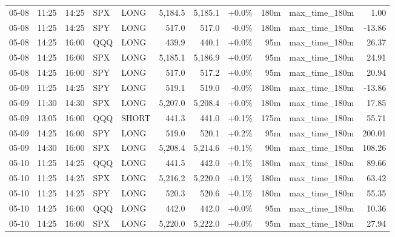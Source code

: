 \documentclass[11pt,a4paper,twoside]{article}
\begin{document}
\begin{center}
\begin{longtable}{>{\color{txtmain}}l l l l l r r r r >{\color{txtmain}}l r}
05-08 & 11:25 & 14:25 & SPX & LONG & 5,184.5 & 5,185.1 & \textcolor{wingreen}{+0.0\%} & 180m & max\_time\_180m & \textcolor{wingreen}{1.00} \\
05-08 & 11:25 & 14:25 & SPY & LONG & 517.0 & 517.0 & \textcolor{lossred}{-0.0\%} & 180m & max\_time\_180m & \textcolor{lossred}{-13.86} \\
05-08 & 14:25 & 16:00 & QQQ & LONG & 439.9 & 440.1 & \textcolor{wingreen}{+0.0\%} & 95m & max\_time\_180m & \textcolor{wingreen}{26.37} \\
05-08 & 14:25 & 16:00 & SPX & LONG & 5,185.1 & 5,186.9 & \textcolor{wingreen}{+0.0\%} & 95m & max\_time\_180m & \textcolor{wingreen}{24.91} \\
05-08 & 14:25 & 16:00 & SPY & LONG & 517.0 & 517.2 & \textcolor{wingreen}{+0.0\%} & 95m & max\_time\_180m & \textcolor{wingreen}{20.94} \\
05-09 & 11:25 & 14:25 & SPY & LONG & 519.1 & 519.0 & \textcolor{lossred}{-0.0\%} & 180m & max\_time\_180m & \textcolor{lossred}{-13.86} \\
05-09 & 11:30 & 14:30 & SPX & LONG & 5,207.0 & 5,208.4 & \textcolor{wingreen}{+0.0\%} & 180m & max\_time\_180m & \textcolor{wingreen}{17.85} \\
05-09 & 13:05 & 16:00 & QQQ & SHORT & 441.3 & 441.0 & \textcolor{wingreen}{+0.1\%} & 175m & max\_time\_180m & \textcolor{wingreen}{55.71} \\
05-09 & 14:25 & 16:00 & SPY & LONG & 519.0 & 520.1 & \textcolor{wingreen}{+0.2\%} & 95m & max\_time\_180m & \textcolor{wingreen}{200.01} \\
05-09 & 14:30 & 16:00 & SPX & LONG & 5,208.4 & 5,214.6 & \textcolor{wingreen}{+0.1\%} & 90m & max\_time\_180m & \textcolor{wingreen}{108.26} \\
05-10 & 11:25 & 14:25 & QQQ & LONG & 441.5 & 442.0 & \textcolor{wingreen}{+0.1\%} & 180m & max\_time\_180m & \textcolor{wingreen}{89.66} \\
05-10 & 11:25 & 14:25 & SPX & LONG & 5,216.2 & 5,220.0 & \textcolor{wingreen}{+0.1\%} & 180m & max\_time\_180m & \textcolor{wingreen}{63.42} \\
05-10 & 11:25 & 14:25 & SPY & LONG & 520.3 & 520.6 & \textcolor{wingreen}{+0.1\%} & 180m & max\_time\_180m & \textcolor{wingreen}{55.35} \\
05-10 & 14:25 & 16:00 & QQQ & LONG & 442.0 & 442.0 & \textcolor{wingreen}{+0.0\%} & 95m & max\_time\_180m & \textcolor{wingreen}{10.36} \\
05-10 & 14:25 & 16:00 & SPX & LONG & 5,220.0 & 5,222.0 & \textcolor{wingreen}{+0.0\%} & 95m & max\_time\_180m & \textcolor{wingreen}{27.94} \\

\end{longtable}
\end{center}
\end{document}
